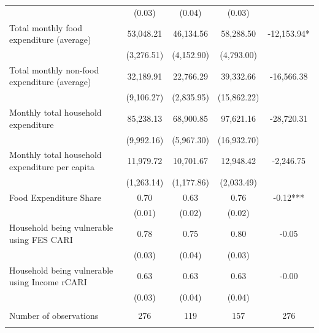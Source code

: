 \begin{tabular}{@{\extracolsep{5pt}}lcccc}
 & (0.03)  & (0.04)  & (0.03)  &  \\ [1ex]
Total monthly food expenditure (average)   & 53,048.21    & 46,134.56    & 58,288.50    & -12,153.94*   \\
 & (3,276.51)  & (4,152.90)  & (4,793.00)  &  \\ [1ex]
Total monthly non-food expenditure (average)   & 32,189.91    & 22,766.29    & 39,332.66    & -16,566.38   \\
 & (9,106.27)  & (2,835.95)  & (15,862.22)  &  \\ [1ex]
Monthly total household expenditure   & 85,238.13    & 68,900.85    & 97,621.16    & -28,720.31   \\
 & (9,992.16)  & (5,967.30)  & (16,932.70)  &  \\ [1ex]
Monthly total household expenditure per capita   & 11,979.72    & 10,701.67    & 12,948.42    & -2,246.75   \\
 & (1,263.14)  & (1,177.86)  & (2,033.49)  &  \\ [1ex]
Food Expenditure Share   & 0.70    & 0.63    & 0.76    & -0.12***   \\
 & (0.01)  & (0.02)  & (0.02)  &  \\ [1ex]
Household being vulnerable using FES CARI   & 0.78    & 0.75    & 0.80    & -0.05   \\
 & (0.03)  & (0.04)  & (0.03)  &  \\ [1ex]
Household being vulnerable using Income rCARI   & 0.63    & 0.63    & 0.63    & -0.00   \\
 & (0.03)  & (0.04)  & (0.04)  &  \\ [1ex]
\hline \\[-1.8ex]
Number of observations  & 276   & 119   & 157  & 276  \\
\hline \hline \\[-1.8ex]

\end{tabular}
